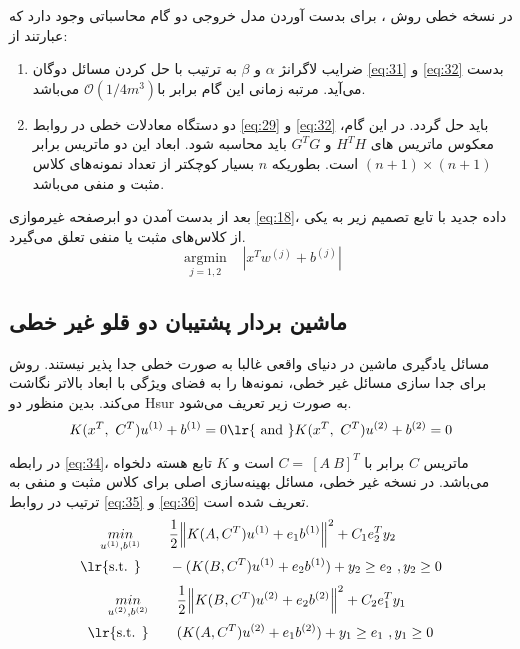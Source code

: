 در نسخه خطی روش ، برای بدست آوردن مدل خروجی دو گام محاسباتی وجود دارد که عبارتند از:
\begin{enumerate}
	\item ضرایب لاگرانژ $\alpha$  و $\beta$  به ترتیب با حل کردن مسائل دوگان \ref{eq:31} و \ref{eq:32} بدست می‌آید. مرتبه زمانی این گام برابر با$\mathcal{O}({1/4{m}^{3}})$  می‌باشد.
	\item	دو دستگاه معادلات خطی در روابط   \ref{eq:29} و \ref{eq:32} باید حل گردد. در این گام، معکوس ماتریس های  $H^{T}H$ و  $G^{T}G$ باید محاسبه شود. ابعاد این دو ماتریس برابر $(n + 1) \times (n + 1)$  است. بطوریکه   $n$ بسیار کوچکتر از تعداد نمونه‌های   کلاس مثبت و منفی می‌باشد.
\end{enumerate}

بعد از بدست آمدن دو ابرصفحه غیرموازی \ref{eq:18}، داده جدید با تابع تصمیم زیر به یکی از کلاس‌های مثبت یا منفی تعلق می‌گیرد.
\begin{equation}
\underset{j=1,2}{\mathop{arg\min }}\,\text{ } \left| {{x}^{T}}{{w}^{(j)}}+{{b}^{(j)}} \right|
\label{eq:33}
\end{equation}

\subsection{ماشین بردار پشتیبان دو قلو غیر خطی}\label{sec:2:2:2}
مسائل یادگیری ماشین در دنیای واقعی غالبا به صورت خطی جدا پذیر نیستند. روش  برای جدا سازی مسائل غیر خطی، نمونه‌ها را به فضای ویژگی با ابعاد بالاتر نگاشت می‌کند. بدین منظور دو \gls{Hsur}  به صورت زیر تعریف می‌شود.
\begin{equation}
K({{x}^{T}},~{{C}^{T}}){{u}^{\left( 1 \right)}}+{{b}^{\left( 1 \right)}}=0 \text{\lr{ and }} K({{x}^{T}},~{{C}^{T}}){{u}^{\left( 2 \right)}}+{{b}^{\left( 2 \right)}}=0
\label{eq:34}
\end{equation}

در رابطه \ref{eq:34}، ماتریس $C$ برابر با  $C=~\left[ A \  B \right]^{T}$ است و $K$ تابع هسته دلخواه می‌باشد. در نسخه غیر خطی، مسائل بهینه‌سازی اصلی برای کلاس مثبت و منفی به ترتیب در روابط \ref{eq:35} و \ref{eq:36} تعریف شده است. 
\begin{equation}
\begin{split}
\mathop{{ min}}\limits_{u^{(1)} ,b^{(1)}} \qquad & \frac{1}{2}{{\left\| K(A, C^{T}){{u}^{(1)}}+{{e}_{1}}{{b}^{(1)}} \right\|}^{2}}+{{C}_{1}}e_{2}^{T}y_{2} \\
\textrm{\lr{s.t. }} \qquad & -(K(B, C^{T}){{u}^{(1)}}+{{e}_{2}}{{b}^{(1)}})+ y_{2} \ge {{e}_{2}}\text{ },y_{2}\ge 0
\end{split}
\label{eq:35}
\end{equation}
\begin{equation}
\begin{split}
\mathop{{ min}}\limits_{u^{(2)} ,b^{(2)}} \qquad & \frac{1}{2}{{\left\| K(B, C^{T}){{u}^{(2)}}+{{e}_{2}}{{b}^{(2)}} \right\|}^{2}}+{{C}_{2}}e_{1}^{T}y_{1} \\
\textrm{\lr{s.t. }} \qquad & (K(A, C^{T}){{u}^{(2)}}+{{e}_{1}}{{b}^{(2)}})+ y_{1} \ge {{e}_{1}}\text{ },y_{1}\ge 0
\end{split}
\label{eq:36}
\end{equation}

